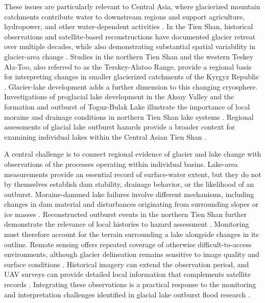 \documentclass[geosciences,article,submit,moreauthors]{Definitions/mdpi}
\begin{document}
These issues are particularly relevant to Central Asia, where glacierized mountain catchments contribute water to downstream regions and support agriculture, hydropower, and other water-dependent activities \citep{Sorg2012,chen2016}. In the Tien Shan, historical observations and satellite-based reconstructions have documented glacier retreat over multiple decades, while also demonstrating substantial spatial variability in glacier-area change \citep{Aizen2006,Narama2010}. Studies in the northern Tien Shan and the western Teskey Ala-Too, also referred to as the Terskey-Alatoo Range, provide a regional basis for interpreting changes in smaller glacierized catchments of the Kyrgyz Republic \citep{bolch2007,Narama2006}. Glacier-lake development adds a further dimension to this changing cryosphere. Investigations of proglacial lake development in the Aksay Valley and the formation and outburst of Toguz-Bulak Lake illustrate the importance of local moraine and drainage conditions in northern Tien Shan lake systems \citep{Zaginaev2019,Daiyrov2020}. Regional assessments of glacial lake outburst hazards provide a broader context for examining individual lakes within the Central Asian Tien Shan \citep{Chen2024}.

A central challenge is to connect regional evidence of glacier and lake change with observations of the processes operating within individual basins. Lake-area measurements provide an essential record of surface-water extent, but they do not by themselves establish dam stability, drainage behavior, or the likelihood of an outburst. Moraine-dammed lake failures involve different mechanisms, including changes in dam material and disturbances originating from surrounding slopes or ice masses \citep{Clague2000,Emmer2013}. Reconstructed outburst events in the northern Tien Shan further demonstrate the relevance of local histories to hazard assessment \citep{Zaginaev2016}. Monitoring must therefore account for the terrain surrounding a lake alongside changes in its outline. Remote sensing offers repeated coverage of otherwise difficult-to-access environments, although glacier delineation remains sensitive to image quality and surface conditions \citep{Paul2013}. Historical imagery can extend the observation period, and UAV surveys can provide detailed local information that complements satellite records \citep{Dehecq2020,Bhardwaj2016}. Integrating these observations is a practical response to the monitoring and interpretation challenges identified in glacial lake outburst flood research \citep{Emmer2022}.
\end{document}
